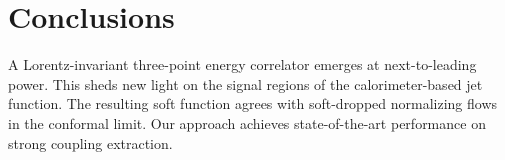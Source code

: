 \section{Conclusions}\label{sec:conclusions}

A Lorentz-invariant three-point energy correlator emerges at
next-to-leading power. This sheds new light on the signal regions of the
calorimeter-based jet function. The resulting soft function agrees with
soft-dropped normalizing flows in the conformal limit. Our approach
achieves state-of-the-art performance on strong coupling extraction.

